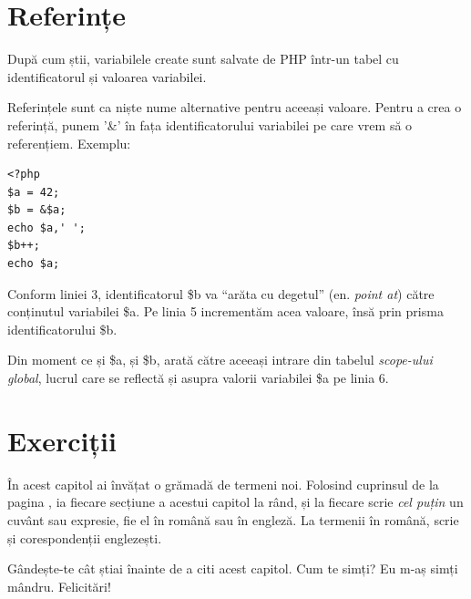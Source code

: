 \section{Referințe}
După cum știi, variabilele create sunt salvate de PHP într-un tabel cu identificatorul
și valoarea variabilei.

Referințele sunt ca niște nume alternative pentru aceeași valoare. Pentru a crea o referință,
punem '\&' în fața identificatorului variabilei pe care vrem să o referențiem. Exemplu:

\begin{lstlisting}
<?php
$a = 42;
$b = &$a;
echo $a,' ';
$b++;
echo $a;
\end{lstlisting}
Conform liniei 3, identificatorul \$b va ``arăta cu degetul'' (en. \textsl{point at})
către conținutul variabilei \$a. Pe linia 5 incrementăm acea valoare, însă prin prisma
identificatorului \$b.

Din moment ce și \$a, și \$b, arată către aceeași intrare din tabelul
\textit{\textit{scope}-ului global}, lucrul care
se reflectă și asupra valorii variabilei \$a pe linia 6.

\section{Exerciții}

\begin{Exercise}[title={Terminologie},difficulty=1]
În acest capitol ai învățat o grămadă de termeni noi.
Folosind cuprinsul de la pagina \pageref{cuprins},
ia fiecare secțiune a acestui capitol la rând, și la fiecare
scrie \textit{cel puțin} un cuvânt sau expresie,
fie el în română sau în engleză. La termenii în română,
scrie și corespondenții englezești.

Gândește-te cât știai înainte de a citi acest
capitol. Cum te simți? Eu m-aș simți mândru.
Felicitări!
\end{Exercise}

